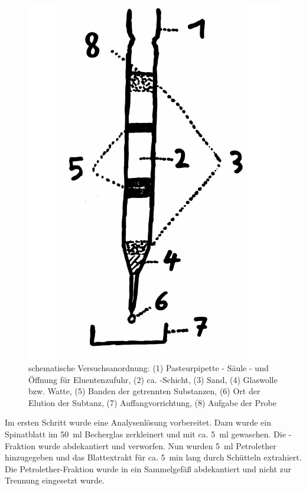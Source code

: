 \documentclass{article}
\begin{document}
        \begin{figure}[H]
          \includegraphics[scale=0.08, center]{Graphiken/Versuchsanordnungen/VersuchsanordnungSC.png} 
          \caption[schematische Versuchsanordnung Säulenchromatographie, Quelle: Autor]{schematische Versuchsanordnung: (1) Pasteurpipette - Säule - und Öffnung für Eluentenzufuhr, (2) ca. -Schicht, (3) Sand, (4) Glaswolle bzw. Watte, (5) Banden der getrennten Substanzen, (6) Ort der Elution der Subtanz, (7) Auffangvorrichtung, (8) Aufgabe der Probe}
          \label{fig:Versuchsanordnungzwei}
        \end{figure}
        
        Im ersten Schritt wurde eine Analysenlösung vorbereitet. Dazu wurde ein Spinatblatt im \SI[mode=text,separate-uncertainty=true]{50}{\milli\litre} Becherglas zerkleinert und mit ca. \SI[mode=text]{5}{\milli\litre}  gewaschen. Die -Fraktion wurde abdekantiert und verworfen. Nun wurden \SI[mode=text]{5}{\milli\litre} Petrolether hinzugegeben und das Blattextrakt für ca. \SI[mode=text]{5}{\minute} lang durch Schütteln extrahiert. Die Petrolether-Fraktion wurde in ein Sammelgefäß abdekantiert und nicht zur Trennung eingesetzt wurde. 
        
\end{document}
